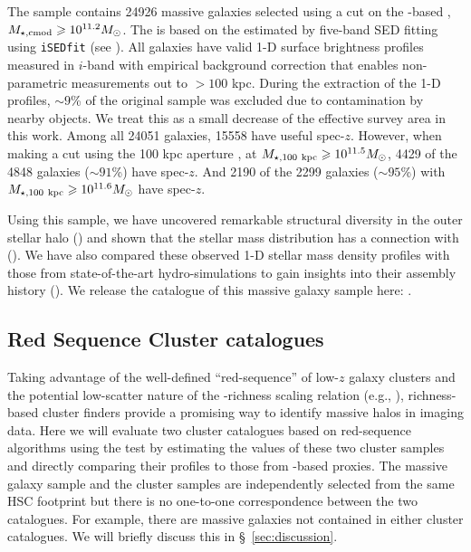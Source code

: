 \documentclass[fleqn,usenatbib,useAMS]{mnras}
\begin{document}
    The sample contains 24926 massive galaxies selected using a cut on the \cmodel{}-based 
    \mstar{}, $M_{\star,\mathrm{cmod}}{} \geqslant 10^{11.2} M_{\odot}$.
    The \mcmodel{} is based on the \mlratio{} estimated by five-band SED fitting using
    \texttt{iSEDfit} (see \citealt{Moustakas2013}).
    All galaxies have valid 1-D surface brightness profiles measured in $i$-band with empirical
    background correction that enables non-parametric \mstar{} measurements out to $>100$ kpc.
    During the extraction of the 1-D profiles, $\sim 9$\% of the original sample was excluded 
    due to contamination by nearby objects. 
    We treat this as a small decrease of the effective survey area in this work.
    Among all 24051 galaxies, 15558 have useful spec-$z$.
    However, when making a cut using the 100 kpc aperture \mstar{}, at $M_{\star, {100}\ \rm kpc} \geqslant 10^{11.5}
    M_{\odot}$, 4429 of the 4848 galaxies ($\sim 91$\%) have spec-$z$.
    And 2190 of the 2299 galaxies ($\sim 95$\%) with $M_{\star, {100}\ \rm kpc} \geqslant 10^{11.6} M_{\odot}$ have
    spec-$z$.

    Using this sample, we have uncovered remarkable structural diversity in the outer stellar halo
    (\citealt{Huang2018b}) and shown that the stellar mass distribution has a connection with
    \mvir{} (\citealt{Huang2018c, Huang2020}).
    We have also compared these observed 1-D stellar mass density profiles with those from
    state-of-the-art hydro-simulations to gain insights into their assembly history
    (\citealt{Ardila2021}).
    We release the catalogue of this massive galaxy sample here:
    \href{https://zenodo.org/record/4902141}{\faDatabase}.

\subsection{Red Sequence Cluster catalogues}
    \label{sec:cluster_sample}

    Taking advantage of the well-defined ``red-sequence'' of low-$z$ galaxy clusters and the
    potential low-scatter nature of the \mvir{}-richness scaling relation (e.g., \citealt{Rozo2009,
    Rykoff2012}), richness-based cluster finders provide a promising way to identify massive halos
    in imaging data.
    Here we will evaluate two cluster catalogues based on red-sequence algorithms using the \topn{}
    test by estimating the \sigmvir{} values of these two cluster samples and directly comparing
    their \dsigma{} profiles to those from \mstar{}-based \mvir{} proxies.
    The massive galaxy sample and the cluster samples are independently selected from the same 
    HSC footprint but there is no one-to-one correspondence between the two catalogues. 
    For example, there are massive galaxies not contained in either cluster catalogues. 
    We will briefly discuss this in \S\ \ref{sec:discussion}.
    
\end{document}
